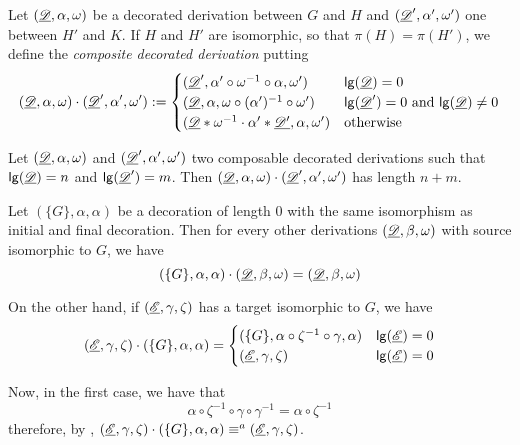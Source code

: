 \begin{definition}\label{def:conc}
	Let $(\underline{\mathscr{D}}, \alpha, \omega)$ be a decorated derivation between $G$ and $H$ and $(\underline{\mathscr{D}}', \alpha', \omega')$ one between $H'$ and $K$. If $H$ and $H'$ are isomorphic, so that $\pi(H)=\pi(H')$, we define the  \emph{composite decorated derivation} putting
	\[(\underline{\mathscr{D}}, \alpha, \omega)\cdot (\underline{\mathscr{D}}', \alpha', \omega'):=\begin{cases}
		(\underline{\mathscr{D}}', \alpha'\circ \omega^{-1}\circ \alpha, \omega')	&\mathsf{lg}(\underline{\mathscr{D}})=0 \\
		(\underline{\mathscr{D}}, \alpha, \omega \circ (\alpha')^{-1}\circ \omega')&\mathsf{lg}(\underline{\mathscr{D}}')=0 \text{ and } \mathsf{lg}(\underline{\mathscr{D}})\neq 0\\
		(\underline{\mathscr{D}}*\omega^{-1}\cdot \alpha'*\underline{\mathscr{D'}}, \alpha, \omega')	&\text{otherwise}
	\end{cases}\]
\end{definition}

\begin{remark}\label{rem:lgt}
	Let $(\underline{\mathscr{D}}, \alpha, \omega)$ and $(\underline{\mathscr{D}}', \alpha', \omega')$ two composable decorated derivations   such that $\mathsf{lg}(\underline{\mathscr{D}})=n$ and $\mathsf{lg}(\underline{\mathscr{D}}')=m$.	 Then $(\underline{\mathscr{D}}, \alpha, \omega)\cdot (\underline{\mathscr{D}}', \alpha', \omega')$ has length $n+m$.
\end{remark}

\begin{remark}\label{rem:id}
	Let  $(\{G\}, \alpha, \alpha)$ be a decoration of length $0$ with the same isomorphism as initial and final decoration. Then for every other derivations $(\underline{\mathscr{D}}, \beta, \omega)$ with source isomorphic to $G$, we have
	\[(\{G\}, \alpha, \alpha)\cdot (\underline{\mathscr{D}}, \beta, \omega) = (\underline{\mathscr{D}}, \beta, \omega)\]
	
	On the other hand, if  $(\underline{\mathscr{E}}, \gamma, \zeta)$  has a target isomorphic to $G$, we have
	\[(\underline{\mathscr{E}}, \gamma, \zeta)\cdot (\{G\}, \alpha, \alpha) = \begin{cases}
		(\{G\}, \alpha \circ \zeta^{-1}\circ \gamma, \alpha)	&\mathsf{lg}(\underline{\mathscr{E}})=0 \\
		(\underline{\mathscr{E}}, \gamma, \zeta )& \mathsf{lg}(\underline{\mathscr{E}})= 0
	\end{cases}\]
	
Now,  in the first case, we have that
\[\alpha \circ \zeta^{-1} \circ \gamma \circ \gamma ^{-1} = \alpha \circ \zeta^{-1}\]
therefore, by , $(\underline{\mathscr{E}}, \gamma, \zeta)\cdot (\{G\}, \alpha, \alpha)\equiv^a  (\underline{\mathscr{E}}, \gamma, \zeta)$.
\end{remark}

